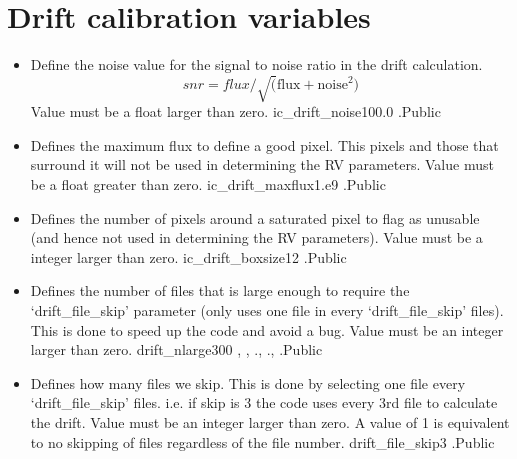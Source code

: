 \clearpage
\newpage
\section{Drift calibration variables}
\label{ch:variables:drift}

\begin{itemize}


\item {}
{Define the noise value for the signal to noise ratio in the drift calculation.
\begin{equation}
snr = flux/\sqrt(\text{flux} + \text{noise}^2)
\end{equation}
Value must be a float larger than zero.
}
{ic\_drift\_noise}{100.0}
{\calDRIFTRAW}{\constantsfile}{\calDRIFTRAW.\progMAIN}{Public}


\item {}
{Defines the maximum flux to define a good pixel. This pixels and those that surround it will not be used in determining the RV parameters. Value must be a float greater than zero.}
{ic\_drift\_maxflux}{1.e9}
{\calDRIFTRAW}{\constantsfile}{\calDRIFTRAW.\progMAIN}{Public}


\item {}
{Defines the number of pixels around a saturated pixel to flag as unusable (and hence not used in determining the RV parameters). Value must be a integer larger than zero.}
{ic\_drift\_boxsize}{12}
{\calDRIFTRAW}{\constantsfile}{\calDRIFTRAW.\progMAIN}{Public}


\item {}
{Defines the number of files that is large enough to require the `drift\_file\_skip' parameter (only uses one file in every `drift\_file\_skip' files). This is done to speed up the code and avoid a bug. Value must be an integer larger than zero.}
{drift\_nlarge}{300}
{\calDRIFTRAW, \calDRIFTE, \calDRIFTPEAK}{\constantsfile}{\calDRIFTRAW.\progMAIN, \calDRIFTE.\progMAIN, \calDRIFTPEAK.\progMAIN}{Public}


\item {}
{Defines how many files we skip. This is done by selecting one file every `drift\_file\_skip' files. i.e. if skip is 3 the code uses every 3rd file to calculate the drift. Value must be an integer larger than zero. A value of 1 is equivalent to no skipping of files regardless of the file number.}
{drift\_file\_skip}{3}
{\calDRIFTRAW}{\constantsfile}{\calDRIFTRAW.\progMAIN}{Public}



\end{itemize}
